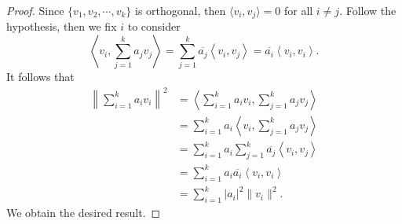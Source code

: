 \begin{Exercise}
\begin{proof}
Since $\{v_1, v_2, \cdots, v_k\}$ is orthogonal, then $\langle v_i, v_j \rangle = 0$ for all $i\neq j$. Follow the hypothesis, then we fix $i$ to consider 
$$
\left\langle v_i, \sum_{j=1}^{k} a_j v_j \right\rangle
= \sum_{j=1}^{k} \overline{a_j} \left\langle v_i, v_j \right\rangle
= \overline{a_i}\left\langle v_i, v_i \right\rangle.
$$
It follows that
\begin{align*}
\left\| \sum_{i=1}^{k} a_i v_i \right\|^2
&= \left\langle \sum_{i=1}^{k} a_i v_i, \sum_{j=1}^{k} a_j v_j \right\rangle \\
&= \sum_{i=1}^{k} a_i \left\langle v_i, \sum_{j=1}^{k} a_j v_j \right\rangle \\
&= \sum_{i=1}^{k} a_i \sum_{j=1}^{k} \overline{a_j} \left\langle v_i, v_j \right\rangle \\
&= \sum_{i=1}^{k} a_i \overline{a_i} \left\langle v_i, v_i \right\rangle \\
&= \sum_{i=1}^{k} |a_i|^2 \| v_i \|^2.
\end{align*}
We obtain the desired result.
\end{proof}
\end{Exercise}